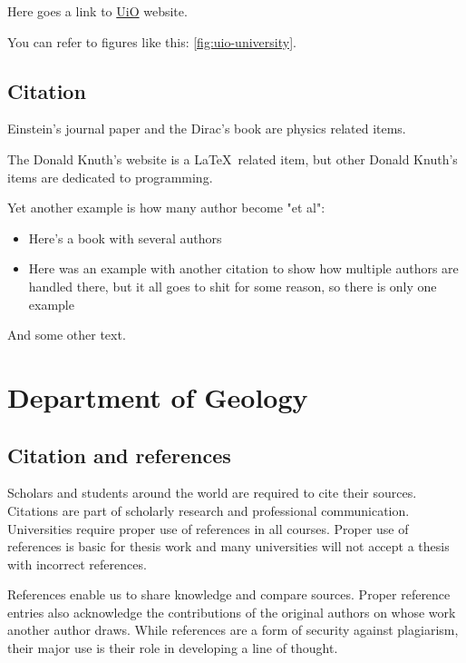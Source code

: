 Here goes a link to \href{https://www.uio.no/}{UiO} website.

You can refer to figures like this: \autoref{fig:uio-university}.

\subsection{Citation}

Einstein's journal paper \citeyear{einstein1905} and the Dirac's book \cite[Chapter~2]{dirac1981} are physics related items.

The Donald Knuth's website \cite{knuth2016} is a \LaTeX\ related item, but other Donald Knuth's items \cite{knuth1973} are dedicated to programming.

Yet another example is how many author become "et al":

\begin{itemize}
    \item Here's a book with several authors \cite{gnomes}
    \item Here was an example with another citation to show how multiple authors are handled there, but it all goes to shit for some reason, so there is only one example
\end{itemize}

And some other text.

\newpage

\section{Department of Geology}

\subsection{Citation and references}

Scholars and students around the world are required to cite their sources. Citations are part of scholarly research and professional communication. Universities require proper use of references in all courses. Proper use of references is basic for thesis work and many universities will not accept a thesis with incorrect references.

References enable us to share knowledge and compare sources. Proper reference entries also acknowledge the contributions of the original authors on whose work another author draws. While references are a form of security against plagiarism, their major use is their role in developing a line of thought.

